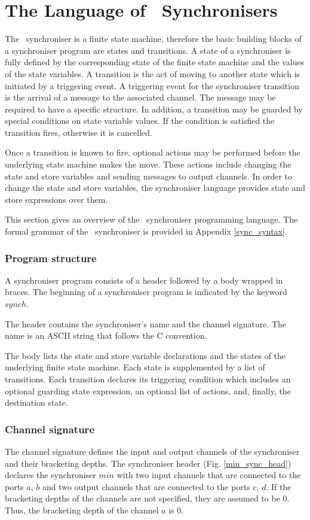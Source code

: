 \section{The Language of \ak\ Synchronisers}
The \ak\ synchroniser is a finite state machine, therefore the basic building blocks of a synchroniser program are states and transitions. A state of a synchroniser is fully defined by the corresponding state of the finite state machine and the values of the state variables. A transition is the act of moving to another state which is initiated by a triggering event. A triggering event for the synchroniser transition is the arrival of a message to the associated channel. The message may be required to have a specific structure. In addition, a transition may be guarded by special conditions on state variable values. If the condition is satisfied the transition fires, otherwise it is cancelled.

Once a transition is known to fire, optional actions may be performed before the underlying state machine makes the move. These actions include changing the state and store variables and sending messages to output channels. In order to change the state and store variables, the synchroniser language provides state and store expressions over them.

This section gives an overview of the \ak\ synchroniser programming language. The formal grammar of the \ak\ synchroniser is provided in Appendix \ref{sync_syntax}.

  \subsubsection*{Program structure}
A synchroniser program consists of a header followed by a body wrapped in braces. The beginning of a synchroniser program is indicated by the keyword $synch$.

The header contains the synchroniser's name and the channel signature. The name is an ASCII string that follows the C convention.

The body lists the state and store variable declarations and the states of the underlying finite state machine. Each state is supplemented by a list of transitions. Each transition declares its triggering condition which includes an optional guarding state expression, an optional list of actions, and, finally, the destination state.


  \subsubsection*{Channel signature}
The channel signature defines the input and output channels of the synchroniser and their bracketing depths. The synchroniser header (Fig. \ref{min_sync_head}) declares the synchroniser $min$ with two input channels that are connected to the ports $a$, $b$ and two output channels that are connected to the ports $c$, $d$. If the bracketing depths of the channels are not specified, they are assumed to be 0. Thus, the bracketing depth of the channel $a$ is 0.

